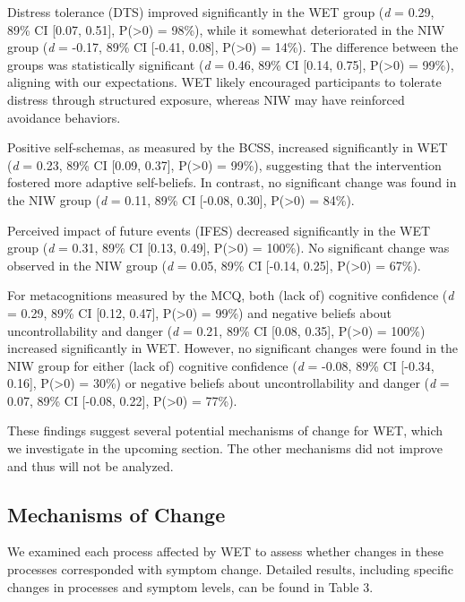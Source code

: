 \documentclass[
  man,floatsintext]{apa7}
\begin{document}
Distress tolerance (DTS) improved significantly in the WET group (\emph{d} = 0.29, 89\% CI {[}0.07, 0.51{]}, P(\textgreater0) = 98\%), while it somewhat deteriorated in the NIW group (\emph{d} = -0.17, 89\% CI {[}-0.41, 0.08{]}, P(\textgreater0) = 14\%).
The difference between the groups was statistically significant (\emph{d} = 0.46, 89\% CI {[}0.14, 0.75{]}, P(\textgreater0) = 99\%), aligning with our expectations.
WET likely encouraged participants to tolerate distress through structured exposure, whereas NIW may have reinforced avoidance behaviors.

Positive self-schemas, as measured by the BCSS, increased significantly in WET (\emph{d} = 0.23, 89\% CI {[}0.09, 0.37{]}, P(\textgreater0) = 99\%), suggesting that the intervention fostered more adaptive self-beliefs.
In contrast, no significant change was found in the NIW group (\emph{d} = 0.11, 89\% CI {[}-0.08, 0.30{]}, P(\textgreater0) = 84\%).

Perceived impact of future events (IFES) decreased significantly in the WET group (\emph{d} = 0.31, 89\% CI {[}0.13, 0.49{]}, P(\textgreater0) = 100\%).
No significant change was observed in the NIW group (\emph{d} = 0.05, 89\% CI {[}-0.14, 0.25{]}, P(\textgreater0) = 67\%).

For metacognitions measured by the MCQ, both (lack of) cognitive confidence (\emph{d} = 0.29, 89\% CI {[}0.12, 0.47{]}, P(\textgreater0) = 99\%) and negative beliefs about uncontrollability and danger (\emph{d} = 0.21, 89\% CI {[}0.08, 0.35{]}, P(\textgreater0) = 100\%) increased significantly in WET.
However, no significant changes were found in the NIW group for either (lack of) cognitive confidence (\emph{d} = -0.08, 89\% CI {[}-0.34, 0.16{]}, P(\textgreater0) = 30\%) or negative beliefs about uncontrollability and danger (\emph{d} = 0.07, 89\% CI {[}-0.08, 0.22{]}, P(\textgreater0) = 77\%).

These findings suggest several potential mechanisms of change for WET, which we investigate in the upcoming section.
The other mechanisms did not improve and thus will not be analyzed.

\subsection{Mechanisms of Change}\label{mechanisms-of-change}

We examined each process affected by WET to assess whether changes in these processes corresponded with symptom change.
Detailed results, including specific changes in processes and symptom levels, can be found in Table 3.
\end{document}

